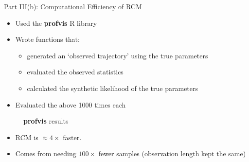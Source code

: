 \documentclass{beamer}
\begin{document}
\begin{frame}{Part III(b): Computational Efficiency of RCM}
    \begin{itemize}
        \item Used the \textbf{profvis} R library
        \item Wrote functions that:
        \begin{itemize}
            \item generated an `observed trajectory' using the true parameters
            \item evaluated the observed statistics
            \item calculated the synthetic likelihood of the true parameters
        \end{itemize}
        \item Evaluated the above 1000 times each
    \end{itemize}
    
    \begin{figure}
        \centering
        \qquad
        \caption{\textbf{profvis} results}
    \end{figure}
    
    \begin{itemize}
        \item RCM is $\approx 4 \times$ faster.
        \item Comes from needing $100 \times$ fewer samples (observation length kept the same)
    \end{itemize}
\end{frame}
\end{document}
